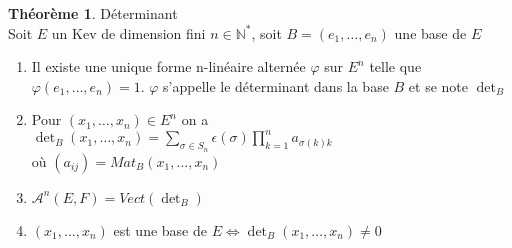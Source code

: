 \documentclass[fleqn]{article}
\theoremstyle{definition} \newtheorem*{defi}{D\'efinition}
\theoremstyle{definition} \newtheorem*{theo}{Th\'eor\`eme}
\theoremstyle{definition} \newtheorem*{coro}{Corollaire}
\theoremstyle{definition} \newtheorem*{nota}{Notation}
\theoremstyle{definition} \newtheorem*{vocab}{Vocabulaire}
\theoremstyle{remark} \newtheorem*{rqs}{Remarques}
\theoremstyle{definition} \newtheorem*{prop}{Propri\'et\'e}
\begin{document}
\begin{theo} D\'eterminant\\
	Soit $E$ un Kev de dimension fini $n \in \mathbb{N}^*$, soit $B = (e_1, \hdots, e_n)$ une base de $E$
	\begin{enumerate}
		\item Il existe une unique forme n-lin\'eaire altern\'ee $\varphi$ sur $E^n$ telle que \mbox{$\varphi(e_1, \hdots, e_n) = 1$}. $\varphi$
			s'appelle le d\'eterminant dans la base $B$ et se note $\det_B$
		\item Pour $(x_1, \hdots, x_n) \in E^n$ on a $\det_B(x_1, \hdots, x_n) = \sum_{\sigma \in S_n} \epsilon(\sigma) \prod_{k=1}^n
			a_{\sigma(k) k}$\\ o\`u $(a_{ij}) = Mat_B(x_1, \hdots, x_n)$
		\item $\mathscr{A}^n(E,F) = Vect(\det_B)$
		\item $(x_1, \hdots, x_n)$ est une base de $E \Leftrightarrow \det_B (x_1, \hdots, x_n) \neq 0$
	\end{enumerate}
\end{theo}
\end{document}
